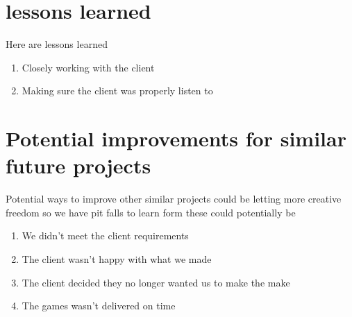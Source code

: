 \documentclass{article}
\begin{document}
\section{lessons learned}
Here are lessons learned
\begin{enumerate}
	\item Closely working with the client
	\item Making sure the client was properly listen to 
\end{enumerate}


\section{Potential improvements for similar future projects} 
Potential ways to improve other similar projects could be letting more creative freedom so we have pit falls to learn form these could potentially be
\begin{enumerate}
	\item We didn't meet the client requirements
	\item The client wasn't happy with what we made
	\item The client decided they no longer wanted us to make the make
	\item The games wasn't delivered on time 
\end{enumerate}
\end{document}
